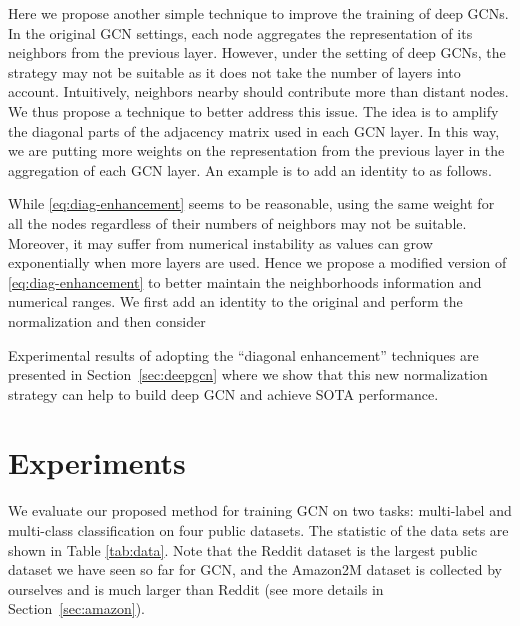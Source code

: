 \documentclass[sigconf]{acmart}
\begin{document}
Here we propose another simple technique to improve the training of deep GCNs.
In the original GCN settings, each node aggregates the representation of its neighbors from the previous layer.
However, under the setting of deep GCNs, the strategy may not be suitable as it does not take the number of layers into account.
Intuitively, neighbors nearby should contribute more than distant nodes.
We thus propose a technique to better address this issue.
The idea is to amplify the diagonal parts of the adjacency matrix  used in each GCN layer.
In this way, we are putting more weights on the representation from the previous layer in the aggregation of each GCN layer.
An example is to add an identity to  as follows.

While \eqref{eq:diag-enhancement} seems to be reasonable, using the same weight for all the nodes regardless of their numbers of neighbors may not be suitable.
Moreover, it may suffer from numerical instability as values can grow exponentially when more layers are used.
Hence we propose a modified version of  \eqref{eq:diag-enhancement} to better maintain the neighborhoods information and numerical ranges.
We first add an identity to the original  and perform the normalization
 and then consider

Experimental results of adopting the ``diagonal enhancement'' techniques are presented in Section~\ref{sec:deepgcn} where we show that this new normalization strategy can help to build deep GCN and achieve SOTA performance.













\section{Experiments}
\label{sec:exp}

We evaluate our proposed method for training GCN on two tasks: multi-label and multi-class classification on four public datasets. 
The statistic of the data sets are shown in Table \ref{tab:data}.
Note that the Reddit dataset is the largest public dataset we have seen so far for GCN, and the Amazon2M dataset is collected by ourselves and is much larger than Reddit (see more details in Section~\ref{sec:amazon}). 
\end{document}
